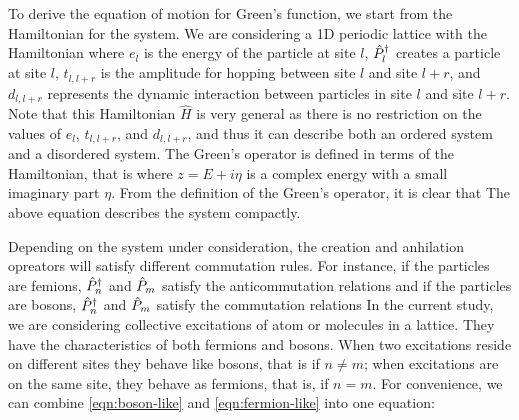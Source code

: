 To derive the equation of motion for Green's function, we start from the Hamiltonian for the system. We are 
considering a 1D periodic lattice with the Hamiltonian
where $e_l$ is the energy of the particle at site $l$, $\hat{P}^{\dagger}_{l}$ creates a particle at site $l$, $t_{l, l+r}$ is the amplitude 
for hopping  between
site $l$ and site $l+r$, and $d_{l, l+r}$ represents the dynamic interaction between particles in 
site $l$ and site $l+r$. Note that this Hamiltonian $\hat{H}$ is very general as there is no restriction on the values 
of $e_l$, $t_{l, l+r}$, and $d_{l, l+r}$, and thus it can describe both an ordered system and a 
disordered system. The Green's operator is defined in terms of the Hamiltonian, that is
where $z = E + i\eta$ is a complex energy with a small imaginary part $\eta$. From the definition of the Green's operator, it is clear that  
The above equation  describes the system compactly. 

Depending on the system under consideration, the creation and anhilation opreators will satisfy different commutation
rules. For instance, if the particles are femions, $\hat{P}^{\dagger}_{n}$ and $\hat{P}_{m}$ satisfy the anticommutation relations
and if the particles are bosons, $\hat{P}^{\dagger}_{n}$ and $\hat{P}_{m}$ satisfy the commutation relations
In the current study, we are considering collective excitations of atom or molecules in a lattice. They have the 
characteristics of both fermions and bosons. When two excitations reside on different sites they behave like
bosons, that is
if $n \neq m$; when excitations are on the same site, they behave as fermions, that is,
if $n = m$. For convenience, we can combine \autoref{eqn:boson-like} and \autoref{eqn:fermion-like} into one equation:

